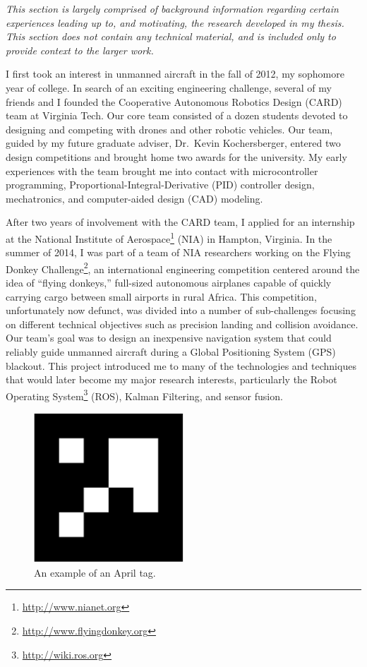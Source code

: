 \textit{This section is largely comprised of background information regarding certain experiences leading up to, and motivating, the research developed in my thesis. This section does not contain any technical material, and is included only to provide context to the larger work.}

\vspace{1em}

I first took an interest in unmanned aircraft in the fall of 2012, my sophomore year of college. In search of an exciting engineering challenge, several of my friends and I founded the Cooperative Autonomous Robotics Design (CARD) team at Virginia Tech. Our core team consisted of a dozen students devoted to designing and competing with drones and other robotic vehicles. Our team, guided by my future graduate adviser, Dr.~Kevin Kochersberger, entered two design competitions and brought home two awards for the university. My early experiences with the team brought me into contact with microcontroller programming, Proportional-Integral-Derivative (PID) controller design, mechatronics, and computer-aided design (CAD) modeling.

After two years of involvement with the CARD team, I applied for an internship at the National Institute of Aerospace\footnote{\url{http://www.nianet.org}} (NIA) in Hampton, Virginia. In the summer of 2014, I was part of a team of NIA researchers working on the Flying Donkey Challenge\footnote{\url{http://www.flyingdonkey.org}}, an international engineering competition centered around the idea of ``flying donkeys,'' full-sized autonomous airplanes capable of quickly carrying cargo between small airports in rural Africa. This competition, unfortunately now defunct, was divided into a number of sub-challenges focusing on different technical objectives such as precision landing and collision avoidance. Our team's goal was to design an inexpensive navigation system that could reliably guide unmanned aircraft during a Global Positioning System (GPS) blackout. This project introduced me to many of the technologies and techniques that would later become my major research interests, particularly the Robot Operating System\footnote{\url{http://wiki.ros.org}} (ROS), Kalman Filtering, and sensor fusion.

\begin{figure}
  \centering
    \includegraphics[width=0.5\textwidth]{april_tag}
  \caption[Example April Tag]{An example of an April tag.}
  \label{fig:april_tag}
\end{figure}

